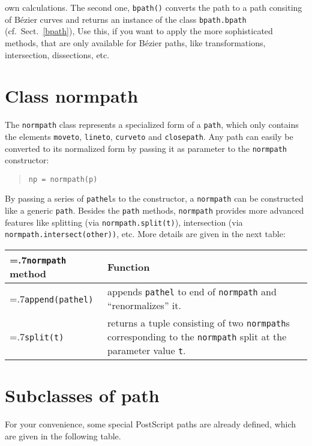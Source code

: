 own calculations. The second one, \verb|bpath()| converts the path to
a path consiting of B\'ezier curves and returns an instance of the class
\verb|bpath.bpath| (cf.\ Sect.~\ref{bpath}), Use this, if you want to
apply the more sophisticated methods, that are only available for
B\'ezier paths, like transformations, intersection, dissections, etc.


\section{Class normpath}

The \texttt{normpath} class represents a specialized form of a
\texttt{path}, which only contains the elements \verb|moveto|,
\verb|lineto|, \verb|curveto| and \verb|closepath|. Any path can
easily be converted to its normalized form by passing it as parameter
to the \texttt{normpath} constructor:
\begin{quote}
\begin{verbatim}
np = normpath(p)
\end{verbatim}
\end{quote}
By passing a series of \texttt{pathel}s to the constructor, a
\texttt{normpath} can be constructed like a generic \texttt{path}.
Besides the \texttt{path} methods, \texttt{normpath} provides more 
advanced features like splitting (via \texttt{normpath.split(t)}),
intersection (via \texttt{normpath.intersect(other))}, etc.
More details are given in the next table:

\begin{tabularx}{\linewidth}{>{\hsize=.7\hsize}X>{\raggedright\arraybackslash\hsize=1.3\hsize}X}
  \texttt{normpath} method & Function \\
  \hline 
  \texttt{append(pathel)} & appends \texttt{pathel} to end of
  \texttt{normpath} and ``renormalizes'' it.\\
  \texttt{split(t)} & returns a tuple consisting of two
  \texttt{normpath}s corresponding to the \texttt{normpath} split at
  the parameter value \texttt{t}.
\end{tabularx}



\section{Subclasses of path}

For your convenience, some special PostScript paths are already defined, which
are given in the following table.

